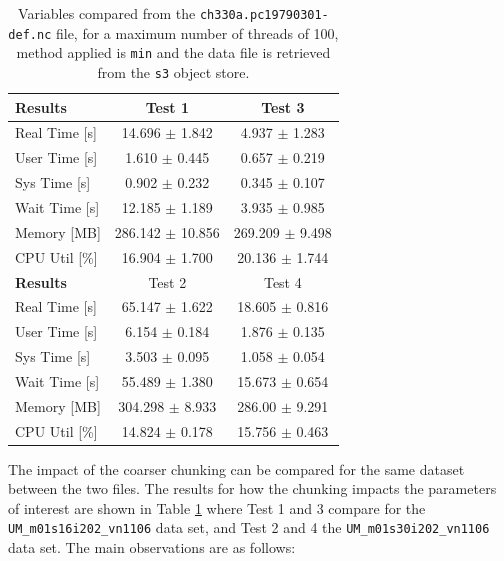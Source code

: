 \documentclass{article}
\begin{document}
\begin{table}[h!] 
    \centering 
    \begin{tabular}{lcc}  \hline
        \textbf{Results} & Test 1               &   Test 3              \\ \hline
        Real Time [s]    & 14.696 $\pm$ 1.842   &   4.937 $\pm$ 1.283   \\
        User Time [s]    & 1.610  $\pm$ 0.445   &   0.657 $\pm$ 0.219   \\
        Sys Time [s]     & 0.902  $\pm$ 0.232   &   0.345 $\pm$ 0.107   \\
        Wait Time [s]    & 12.185 $\pm$ 1.189   &   3.935 $\pm$ 0.985   \\
        Memory [MB]      & 286.142 $\pm$ 10.856 &   269.209 $\pm$ 9.498 \\
        CPU Util [\%]    & 16.904 $\pm$ 1.700   &   20.136 $\pm$ 1.744  \\ \hline \hline


        \textbf{Results}   & Test 2               & Test 4             \\ \hline
        Real Time [s]      & 65.147 $\pm$ 1.622   & 18.605 $\pm$ 0.816 \\
        User Time [s]      & 6.154  $\pm$ 0.184   & 1.876 $\pm$ 0.135  \\
        Sys Time [s]       & 3.503  $\pm$ 0.095   & 1.058 $\pm$ 0.054  \\
        Wait Time [s]      & 55.489 $\pm$ 1.380   & 15.673 $\pm$ 0.654 \\
        Memory [MB]        &304.298 $\pm$ 8.933   & 286.00 $\pm$ 9.291 \\
        CPU Util [\%]      & 14.824 $\pm$ 0.178   & 15.756 $\pm$ 0.463 \\ \hline \hline

        
    \end{tabular} 
    \caption{Variables compared from the \texttt{ch330a.pc19790301-def.nc} file, for a maximum number of threads of 100, method applied is \texttt{min} and the data file is retrieved from the \texttt{s3} object store.} 
    \label{tab:T1T2T3T4_ChunkResults}
\end{table}


\noindent The impact of the coarser chunking can be compared for the same dataset between the two files. The results for how the chunking impacts the parameters of interest are shown in Table \ref{tab:T1T2T3T4_ChunkResults} where Test 1 and 3 compare for the \texttt{UM\_m01s16i202\_vn1106} data set, and Test 2 and 4 the \texttt{UM\_m01s30i202\_vn1106} data set. The main observations are as follows:
\end{document}

